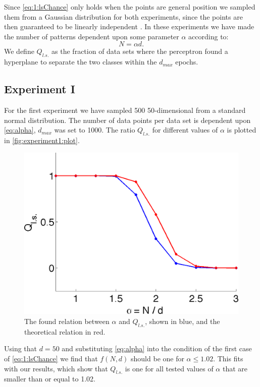 Since \autoref{eq:1:lsChance} only holds when the points are general position we sampled them from a Gaussian distribution for both experiments, since the points are then guaranteed to be linearly independent \cite[Chapter~5]{prince2012computer}. In these experiments we have made the number of patterns dependent upon some parameter $\alpha$ according to: 
	\begin{equation}\label{eq:alpha}
		N = \alpha d.
	\end{equation}
We define $Q_{l.s.}$ as the fraction of data sets where the perceptron found a hyperplane to separate the two classes within the $d_{max}$ epochs.	

\subsection*{Experiment I}\label{ssec:experimentI}
For the first experiment we have sampled 500 50-dimensional from a standard normal distribution. The number of data points per data set is dependent upon \eqref{eq:alpha}, $d_{max}$ was set to 1000. The ratio $Q_{l.s.}$ for different values of $\alpha$ is plotted in \autoref{fig:experiment1:plot}.

\begin{figure}[H]
	\centering
	\includegraphics[width=\columnwidth]{./img/Aa_N50_nd500_nmax1000}
	\caption{The found relation between $\alpha$ and $Q_{l.s.}$, shown in blue, and the theoretical relation in red.}
	\label{fig:experiment1:plot}
\end{figure}

Using that $d = 50$  and substituting \eqref{eq:alpha} into the condition of the first case of \eqref{eq:1:lsChance} we find that $f(N,d)$ should be one for $\alpha \leq 1.02$. This fits with our results, which show that $Q_{l.s.}$ is one for all tested values of $\alpha$ that are smaller than or equal to 1.02. 


